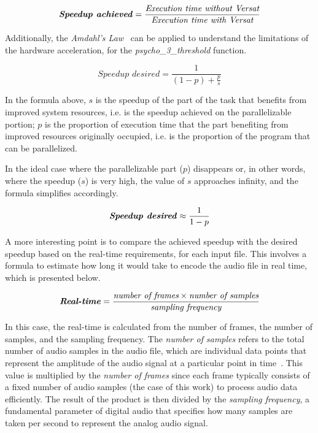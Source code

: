 
\begin{equation}
    \textbf{\textit{Speedup achieved}} = \frac{\textit{Execution time without \textit{Versat}}}{\textit{Execution time with \textit{Versat}}} 
\end{equation}

Additionally, the \textit{Amdahl's Law}~\cite{amdahls} can be applied to understand the limitations of the hardware acceleration, for the \textit{psycho\_3\_threshold} function.

\begin{equation}
    \textit{Speedup desired} = \frac{1}{(1 - p) + \frac{p}{s}} 
\end{equation}

In the formula above, $s$ is the speedup of the part of the task that benefits from improved system resources, i.e. is the speedup achieved on the parallelizable portion; $p$ is the proportion of execution time that the part benefiting from improved resources originally occupied, i.e. is the proportion of the program that can be parallelized.

In the ideal case where the parallelizable part ($p$) disappears or, in other words, where the speedup ($s$) is very high, the value of $s$ approaches infinity, and the formula simplifies accordingly.

\begin{equation}
    \textbf{\textit{Speedup desired}} \approx \frac{1}{1 - p}
\end{equation}

A more interesting point is to compare the achieved speedup with the desired speedup based on the real-time requirements, for each input file. 
This involves a formula to estimate how long it would take to encode the audio file in real time, which is presented below.

\begin{equation}
    \textbf{\textit{Real-time}} = \frac{\textit{number of frames} \times \textit{number of samples}}{\textit{sampling frequency}} 
\end{equation}

In this case, the real-time is calculated from the number of frames, the number of samples, and the sampling frequency.
The \textit{number of samples} refers to the total number of audio samples in the audio file, which are individual data points that represent the amplitude of the audio signal at a particular point in time~\cite{twolamefrontend}. This value is multiplied by the \textit{number of frames} since each frame typically consists of a fixed number of audio samples (the case of this work) to process audio data efficiently. The result of the product is then divided by the \textit{sampling frequency}, a fundamental parameter of digital audio that specifies how many samples are taken per second to represent the analog audio signal.

